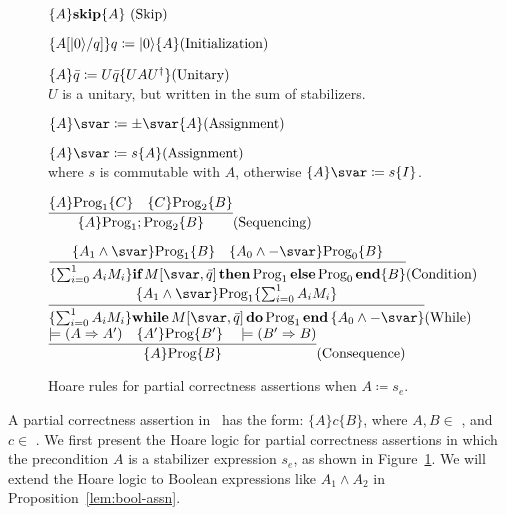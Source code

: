 \begin{figure}
\begingroup\fontsize{\myfontsize}{\mylinesize}
    $\{A\}\textbf{skip}\{A\}\ \hfill\text{(Skip)}$%
    
    $\{A[\ket{0}/q]\} q\coloneqq \ket{0} \{A\} \hfill \text{(Initialization)}$ %
    
    $\{A\} \bar{q}\coloneqq U\bar{q} \{UAU^\dagger\} \hfill\text{(Unitary)}$\\
    \hfill  $U$ is a unitary, but written in the sum of stabilizers.
    
    $\{A\} \svar\coloneqq \pm\svar \{A\} \hfill \text{(Assignment)}$%
    
    $\{A\} \svar\coloneqq s \{A\} \hfill \text{(Assignment)}$ \\
    \hfill  where $s$ is commutable with $A$, otherwise $\{A\} \svar\coloneqq s \{I\}$.
    
    $\infer{\{A\}\prog_1;\prog_2\{B\}}{\{A\}\prog_1\{C\}\quad \{C\}\prog_2\{B\}}\hfill \text{(Sequencing)}$%
    
    
    $\infer{\{\sum_{i=0}^1 A_i M_i\}\textbf{if}\,M[\svar, \bar{q}]\,\textbf{then}\, \prog_1\,\textbf{else}\, \prog_0\,\textbf{end}\{B\}}{\{A_1 \wedge \svar\}\prog_1\{B\}\quad \{A_0 \wedge -\svar \}\prog_0\{B\}} \hfill \text{(Condition)}$
    \\
    
    
    $\infer{\{\sum_{i=0}^1 A_i M_i\} \textbf{while}\, M[\svar, \bar{q}]\, \textbf{do}\, \prog_1\, \textbf{end}\,\{ A_0 \wedge -\svar \} }{\{ A_1 \wedge \svar \}\prog_1\{\sum_{i=0}^1 A_i M_i\} }\hfill \text{(While)}$\\
    
    $\infer{\{A\}\prog\{B\} }{\models (A \Rightarrow A')\quad \{A'\}\prog\{B'\}\quad \models (B' \Rightarrow B)} \hfill \text{(Consequence)}$\\
    
\endgroup
%
    \caption{Hoare rules for partial correctness assertions when $A \coloneqq s_e$.
    }
    \label{fig:pca}%
\end{figure}

A partial correctness assertion in \assnname\ has the form:
\hfill{} $\{A\} c \{B\}$, where $A, B \in $ \assnname, and $c\in$ \langname. We first present the Hoare logic for partial correctness assertions in which the precondition $A$ is a stabilizer expression $s_e$, as shown in Figure~\ref{fig:pca}. We will extend the Hoare logic to Boolean expressions like $A_1 \wedge A_2$ in Proposition~\ref{lem:bool-assn}. %
 
